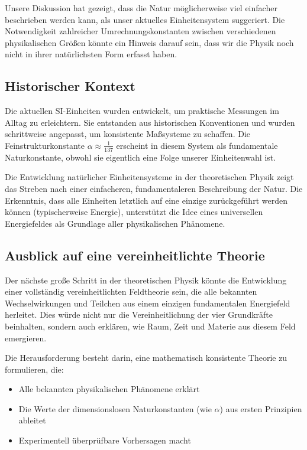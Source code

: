 \documentclass{article}
\begin{document}
Unsere Diskussion hat gezeigt, dass die Natur möglicherweise viel einfacher beschrieben werden kann, als unser aktuelles Einheitensystem suggeriert. Die Notwendigkeit zahlreicher Umrechnungskonstanten zwischen verschiedenen physikalischen Größen könnte ein Hinweis darauf sein, dass wir die Physik noch nicht in ihrer natürlichsten Form erfasst haben.

\subsection{Historischer Kontext}

Die aktuellen SI-Einheiten wurden entwickelt, um praktische Messungen im Alltag zu erleichtern. Sie entstanden aus historischen Konventionen und wurden schrittweise angepasst, um konsistente Maßsysteme zu schaffen. Die Feinstrukturkonstante $\alpha \approx \frac{1}{137}$ erscheint in diesem System als fundamentale Naturkonstante, obwohl sie eigentlich eine Folge unserer Einheitenwahl ist.

Die Entwicklung natürlicher Einheitensysteme in der theoretischen Physik zeigt das Streben nach einer einfacheren, fundamentaleren Beschreibung der Natur. Die Erkenntnis, dass alle Einheiten letztlich auf eine einzige zurückgeführt werden können (typischerweise Energie), unterstützt die Idee eines universellen Energiefeldes als Grundlage aller physikalischen Phänomene.

\subsection{Ausblick auf eine vereinheitlichte Theorie}

Der nächste große Schritt in der theoretischen Physik könnte die Entwicklung einer vollständig vereinheitlichten Feldtheorie sein, die alle bekannten Wechselwirkungen und Teilchen aus einem einzigen fundamentalen Energiefeld herleitet. Dies würde nicht nur die Vereinheitlichung der vier Grundkräfte beinhalten, sondern auch erklären, wie Raum, Zeit und Materie aus diesem Feld emergieren.

Die Herausforderung besteht darin, eine mathematisch konsistente Theorie zu formulieren, die:

\begin{itemize}
	\item Alle bekannten physikalischen Phänomene erklärt
	\item Die Werte der dimensionslosen Naturkonstanten (wie $\alpha$) aus ersten Prinzipien ableitet
	\item Experimentell überprüfbare Vorhersagen macht
\end{itemize}
\end{document}
